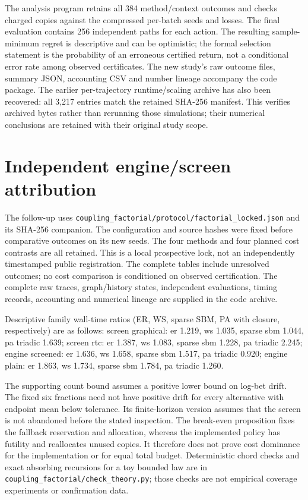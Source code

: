 \documentclass[preprint,11pt,sort&compress]{elsarticle}
\begin{document}
The analysis program retains all 384 method/context outcomes and checks charged copies against the compressed per-batch seeds and losses. The final evaluation contains 256 independent paths for each action. The resulting sample-minimum regret is descriptive and can be optimistic; the formal selection statement is the probability of an erroneous certified return, not a conditional error rate among observed certificates. The new study's raw outcome files, summary JSON, accounting CSV and number lineage accompany the code package. The earlier per-trajectory runtime/scaling archive has also been recovered: all 3,217 entries match the retained SHA-256 manifest. This verifies archived bytes rather than rerunning those simulations; their numerical conclusions are retained with their original study scope.

\FloatBarrier\section{Independent engine/screen attribution}
The follow-up uses \texttt{coupling\_factorial/protocol/factorial\_locked.json}
and its SHA-256 companion. The configuration and source hashes were fixed
before comparative outcomes on its new seeds. The four methods and four
planned cost contrasts are all retained. This is a local prospective lock,
not an independently timestamped public registration. The complete tables include unresolved outcomes; no cost comparison is conditioned on
observed certification. The complete raw traces, graph/history states,
independent evaluations, timing records, accounting and numerical lineage
are supplied in the code archive.

Descriptive family wall-time ratios (ER, WS, sparse SBM, PA with closure,
respectively) are as follows: screen graphical: er 1.219, ws 1.035, sparse sbm 1.044, pa triadic 1.639; screen rtc: er 1.387, ws 1.083, sparse sbm 1.228, pa triadic 2.245; engine screened: er 1.636, ws 1.658, sparse sbm 1.517, pa triadic 0.920; engine plain: er 1.863, ws 1.734, sparse sbm 1.784, pa triadic 1.260.

The supporting count bound assumes a positive lower bound on log-bet drift.
The fixed six fractions need not have positive drift for every alternative
with endpoint mean below tolerance. Its finite-horizon version assumes that
the screen is not abandoned before the stated inspection. The break-even
proposition fixes the fallback reservation and allocation, whereas the
implemented policy has futility and reallocates unused copies. It therefore
does not prove cost dominance for the implementation or for equal total
budget. Deterministic chord checks and exact absorbing recursions for a
toy bounded law are in \texttt{coupling\_factorial/check\_theory.py}; those
checks are not empirical coverage experiments or confirmation data.
\end{document}
